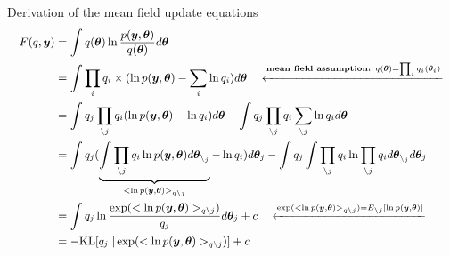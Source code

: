 \documentclass[10pt,mathserif]{beamer}
\begin{document}
\begin{frame}{Derivation of the mean field update equations}
\begin{equation}\small
    \begin{split}
        F(q,\bm{y})
        & = \int q(\bm{\theta})\ln\frac{p(\bm{y},\bm{\theta})}{q(\bm{\theta})}d\bm{\theta}\\
        & = \int \prod_i q_i \times (\ln p(\bm{y},\bm{\theta}) - \sum_i \ln q_i)d\bm{\theta} \ \ \ \xleftarrow{\textbf{mean field assumption: }q(\bm{\theta}) = \prod_i q_i(\bm{\theta}_i)}\\
        & = \int q_j\prod_{\backslash j}q_i(\ln p(\bm{y},\bm{\theta}) - \ln q_i)d\bm{\theta} - \int q_j\prod_{\backslash j}q_i\sum_{\backslash j}\ln q_i d\bm{\theta}\\
        & = \int q_j (\underbrace{\int \prod_{\backslash j} q_i \ln p(\bm{y},\bm{\theta}) d\bm{\theta}_{\backslash_j}}_{<\ln p(\bm{y},\bm{\theta})>_{q\backslash j}}- \ln q_i)d\bm{\theta}_j - \int q_j \int\prod_{\backslash j}q_i \ln \prod_{\backslash j}q_i d\bm{\theta}_{\backslash_j}d\bm{\theta}_j\\
        & = \int q_j\ln\frac{\exp(<\ln p(\bm{y},\bm{\theta})>_{q\backslash j})}{q_j}d\bm{\theta}_j + c \ \ \ \xleftarrow{\exp(<\ln p(\bm{y},\bm{\theta})>_{q\backslash j})  = E_{\backslash j}[\ln p(\bm{y}, \bm{\theta})]}\\
        & = -\mbox{KL}[q_j||\exp(<\ln p(\bm{y},\bm{\theta})>_{q\backslash j})] + c
    \end{split}
\end{equation}
\end{frame}
\end{document}
